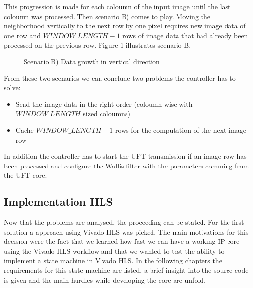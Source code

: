 This progression is made for each coloumn of the input image until the last
coloumn was processed. Then scenario B) comes to play. Moving the neighborhood
vertically to the next row by one pixel requires new image data of one row
and $WINDOW\_LENGTH-1$ rows of image data that had already been processed on the
previous row. Figure \ref{fig:memproblemgrowthy} illustrates scenario B.

\begin{figure}[H]
    \centering
    \begin{adjustbox}{scale=0.7}
        
    \end{adjustbox}
    \caption{Scenario B) Data growth in vertical direction}
    \label{fig:memproblemgrowthy}
\end{figure}

From these two scenarios we can conclude two problems the controller has to
solve:
\begin{itemize}
    \item Send the image data in the right order (coloumn wise with
    $WINDOW\_LENGTH$ sized coloumns)
    \item Cache $WINDOW\_LENGTH-1$ rows for the computation of the next image
    row
\end{itemize}

In addition the controller has to start the UFT transmission if an image row has
been processed and configure the Wallis filter with the parameters comming from
the UFT core.

\clearpage

\subsection{Implementation HLS} \label{ch:controller:hls}
Now that the problems are analysed, the proceeding can be stated. For the first
solution a approach using Vivado HLS was picked. The main motivations for this
decision were the fact that we learned how fast we can have a working IP core
using the Vivado HLS workflow and that we wanted to test the ability to
implement a state machine in Vivado HLS. In the following chapters the
requirements for this state machine are listed, a brief insight into the source
code is given and the main hurdles while developing the core are unfold.

